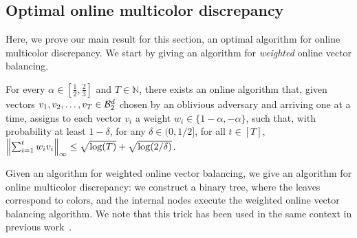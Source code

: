 \subsection{Optimal online multicolor discrepancy}\label{subsec: optimal multicolor discrepancy}

Here, we prove our main result for this section, an optimal algorithm for online multicolor discrepancy. We start by giving an algorithm for \emph{weighted} online vector balancing.

\begin{lemma}\label{lemma:weighted-vector-balancing}
     For every $\alpha \in \left[\frac{1}{2}, \frac{2}{3}\right]$ and $T \in \mathbb{N}$, there exists an online algorithm that, given vectors $v_1, v_2, \ldots, v_T \in \mathcal{B}^d_2$ chosen by an oblivious adversary and arriving one at a time, assigns to each vector $v_i$ a weight $w_i \in \{1-\alpha, -\alpha\}$, such that, with probability at least $1 - \delta$, for any $\delta \in (0,1/2]$, for all $t \in [T]$, $\left\lVert\sum_{i=1}^t w_iv_i\right\rVert_\infty \leq \sqrt{\log(T)} + \sqrt{\log(2/ \delta)}$.
\end{lemma}

Given an algorithm for weighted online vector balancing, we give an algorithm for online multicolor discrepancy: we construct a binary tree, where the leaves correspond to colors, and the internal nodes execute the weighted online vector balancing algorithm. We note that this trick has been used in the same context in previous work~\cite{alweiss2021discrepancy,bansal2021online}.

